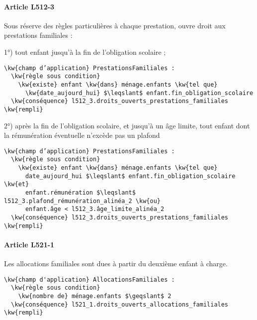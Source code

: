 \documentclass[12pt, french]{article}
\newcommand{\kw}[1]{\textbf{\textcolor{OliveGreen}{#1}}}
\begin{document}
\paragraph{Article L512-3} Sous réserve des règles particulières à chaque prestation, ouvre droit aux prestations familiales :

1°) tout enfant jusqu’à la fin de l’obligation scolaire ;
\begin{Verbatim}[firstnumber=1]
\kw{champ d’application} PrestationsFamiliales :
  \kw{règle sous condition}
    \kw{existe} enfant \kw{dans} ménage.enfants \kw{tel que}
      \kw{date_aujourd_hui} $\leqslant$ enfant.fin_obligation_scolaire
  \kw{conséquence} l512_3.droits_ouverts_prestations_familiales \kw{rempli}
\end{Verbatim}

2°) après la fin de l’obligation scolaire, et jusqu’à un âge limite, tout enfant dont la rémunération éventuelle n’excède pas un plafond

\begin{Verbatim}
\kw{champ d’application} PrestationsFamiliales :
  \kw{règle sous condition}
    \kw{existe} enfant \kw{dans} ménage.enfants \kw{tel que}
      date_aujourd_hui $\leqslant$ enfant.fin_obligation_scolaire \kw{et}
      enfant.rémunération $\leqslant$ l512_3.plafond_rémunération_alinéa_2 \kw{ou}
      enfant.âge < l512_3.âge_limite_alinéa_2
  \kw{conséquence} l512_3.droits_ouverts_prestations_familiales \kw{rempli}
\end{Verbatim}

\paragraph{Article L521-1}

Les allocations familiales sont dues à partir du deuxième enfant à charge.

\begin{Verbatim}
\kw{champ d'application} AllocationsFamiliales :
  \kw{règle sous condition}
    \kw{nombre de} ménage.enfants $\geqslant$ 2
  \kw{conséquence} l521_1.droits_ouverts_allocations_familiales \kw{rempli}
\end{Verbatim}
\end{document}
